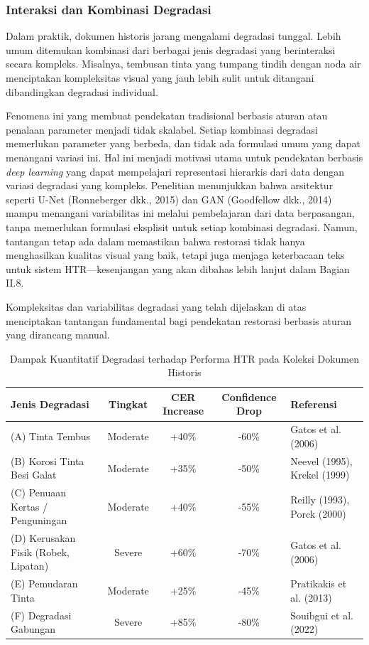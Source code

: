 \documentclass[12pt,a4paper]{book}
\begin{document}
\subsubsection{Interaksi dan Kombinasi Degradasi}
\label{subsubsec:interaksi-degradasi}

\vspace{1.5ex}

Dalam praktik, dokumen historis jarang mengalami degradasi tunggal. Lebih umum ditemukan kombinasi dari berbagai jenis degradasi yang berinteraksi secara kompleks. Misalnya, tembusan tinta yang tumpang tindih dengan noda air menciptakan kompleksitas visual yang jauh lebih sulit untuk ditangani dibandingkan degradasi individual.

Fenomena ini yang membuat pendekatan tradisional berbasis aturan atau penalaan parameter menjadi tidak skalabel. Setiap kombinasi degradasi memerlukan parameter yang berbeda, dan tidak ada formulasi umum yang dapat menangani variasi ini. Hal ini menjadi motivasi utama untuk pendekatan berbasis \textit{deep learning} yang dapat mempelajari representasi hierarkis dari data dengan variasi degradasi yang kompleks. Penelitian menunjukkan bahwa arsitektur seperti U-Net (Ronneberger dkk., 2015) dan GAN (Goodfellow dkk., 2014) mampu menangani variabilitas ini melalui pembelajaran dari data berpasangan, tanpa memerlukan formulasi eksplisit untuk setiap kombinasi degradasi. Namun, tantangan tetap ada dalam memastikan bahwa restorasi tidak hanya menghasilkan kualitas visual yang baik, tetapi juga menjaga keterbacaan teks untuk sistem HTR—kesenjangan yang akan dibahas lebih lanjut dalam Bagian II.8.

\vspace{1.5ex}

Kompleksitas dan variabilitas degradasi yang telah dijelaskan di atas menciptakan tantangan fundamental bagi pendekatan restorasi berbasis aturan yang dirancang manual.

\begin{table}[H]
\centering
\caption{Dampak Kuantitatif Degradasi terhadap Performa HTR pada Koleksi Dokumen Historis}
\label{tab:degradation-impact}
\scriptsize
\begin{tabular}{|p{2.8cm}|c|c|c|p{2.5cm}|}
\hline
\textbf{Jenis Degradasi} & \textbf{Tingkat} & \textbf{CER Increase} & \textbf{Confidence Drop} & \textbf{Referensi} \\
\hline
(A) Tinta Tembus & Moderate & +40\% & -60\% & Gatos et al. (2006) \\
\hline
(B) Korosi Tinta Besi Galat & Moderate & +35\% & -50\% & Neevel (1995), Krekel (1999) \\
\hline
(C) Penuaan Kertas / Penguningan & Moderate & +40\% & -55\% & Reilly (1993), Porck (2000) \\
\hline
(D) Kerusakan Fisik (Robek, Lipatan) & Severe & +60\% & -70\% & Gatos et al. (2006) \\
\hline
(E) Pemudaran Tinta & Moderate & +25\% & -45\% & Pratikakis et al. (2013) \\
\hline
(F) Degradasi Gabungan & Severe & +85\% & -80\% & Souibgui et al. (2022) \\
\hline
\end{tabular}
\end{table}
\end{document}
